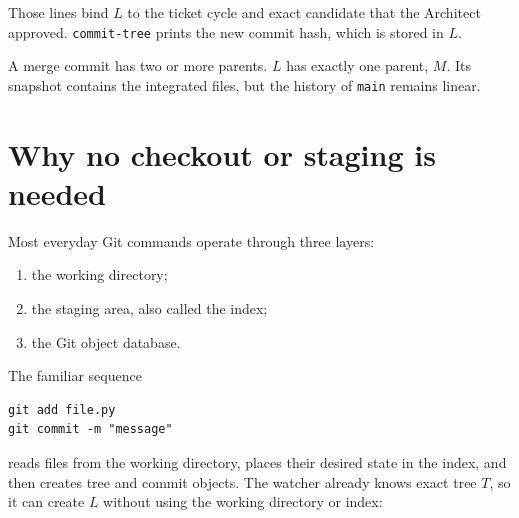 \documentclass[10pt,twocolumn]{article}
\newcommand{\code}[1]{\texttt{#1}}
\begin{document}
Those lines bind $L$ to the ticket cycle and exact candidate that the
Architect approved. \code{commit-tree} prints the new commit hash, which is
stored in $L$.

\begin{keybox}
A merge commit has two or more parents. $L$ has exactly one parent, $M$. Its
snapshot contains the integrated files, but the history of \code{main}
remains linear.
\end{keybox}

\section{Why no checkout or staging is needed}

Most everyday Git commands operate through three layers:

\begin{enumerate}
  \item the working directory;
  \item the staging area, also called the index;
  \item the Git object database.
\end{enumerate}

The familiar sequence

\begin{lstlisting}
git add file.py
git commit -m "message"
\end{lstlisting}

reads files from the working directory, places their desired state in the
index, and then creates tree and commit objects. The watcher already knows
exact tree $T$, so it can create $L$ without using the working directory or
index:

\begin{center}
\end{center}
\end{document}
